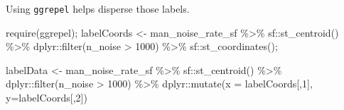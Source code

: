 \documentclass[
  11pt,
]{book}
\newenvironment{Shaded}{\begin{snugshade}}{\end{snugshade}}
\newcommand{\AttributeTok}[1]{\textcolor[rgb]{0.77,0.63,0.00}{#1}}
\newcommand{\DecValTok}[1]{\textcolor[rgb]{0.00,0.00,0.81}{#1}}
\newcommand{\FunctionTok}[1]{\textcolor[rgb]{0.00,0.00,0.00}{#1}}
\newcommand{\NormalTok}[1]{#1}
\newcommand{\OtherTok}[1]{\textcolor[rgb]{0.56,0.35,0.01}{#1}}
\newcommand{\SpecialCharTok}[1]{\textcolor[rgb]{0.00,0.00,0.00}{#1}}
\begin{document}
Using \texttt{ggrepel} helps disperse those labels.

\begin{Shaded}
\begin{Highlighting}[]
\FunctionTok{require}\NormalTok{(ggrepel);}
\NormalTok{labelCoords }\OtherTok{\textless{}{-}}\NormalTok{ man\_noise\_rate\_sf }\SpecialCharTok{\%\textgreater{}\%}\NormalTok{ sf}\SpecialCharTok{::}\FunctionTok{st\_centroid}\NormalTok{() }\SpecialCharTok{\%\textgreater{}\%}
\NormalTok{  dplyr}\SpecialCharTok{::}\FunctionTok{filter}\NormalTok{(n\_noise }\SpecialCharTok{\textgreater{}} \DecValTok{1000}\NormalTok{) }\SpecialCharTok{\%\textgreater{}\%}
\NormalTok{  sf}\SpecialCharTok{::}\FunctionTok{st\_coordinates}\NormalTok{();}

\NormalTok{labelData }\OtherTok{\textless{}{-}}\NormalTok{ man\_noise\_rate\_sf }\SpecialCharTok{\%\textgreater{}\%}\NormalTok{ sf}\SpecialCharTok{::}\FunctionTok{st\_centroid}\NormalTok{() }\SpecialCharTok{\%\textgreater{}\%}
\NormalTok{  dplyr}\SpecialCharTok{::}\FunctionTok{filter}\NormalTok{(n\_noise }\SpecialCharTok{\textgreater{}} \DecValTok{1000}\NormalTok{) }\SpecialCharTok{\%\textgreater{}\%}
\NormalTok{  dplyr}\SpecialCharTok{::}\FunctionTok{mutate}\NormalTok{(}\AttributeTok{x =}\NormalTok{ labelCoords[,}\DecValTok{1}\NormalTok{], }\AttributeTok{y=}\NormalTok{labelCoords[,}\DecValTok{2}\NormalTok{])}
                     


\end{Highlighting}
\end{Shaded}
\end{document}
